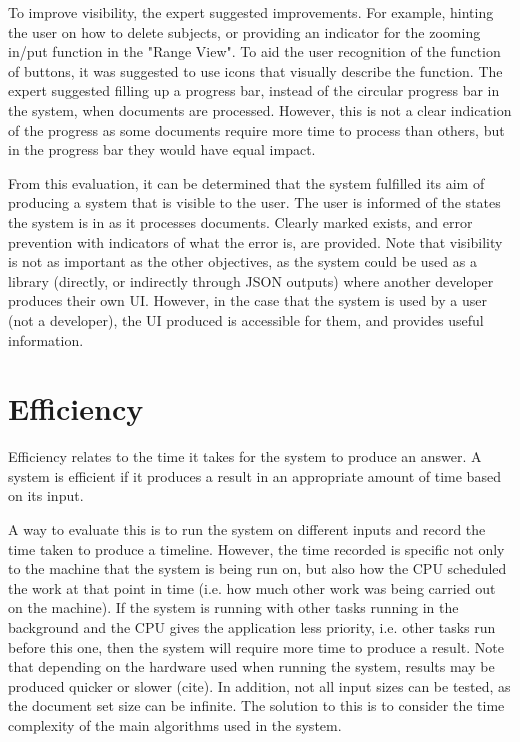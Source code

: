 \par To improve visibility, the expert suggested improvements. For example, hinting the user on how to delete subjects, or providing an indicator for the zooming in/put function in the "Range View". To aid the user recognition of the function of buttons, it was suggested to use icons that visually describe the function. The expert suggested filling up a progress bar, instead of the circular progress bar in the system, when documents are processed. However, this is not a clear indication of the progress as some documents require more time to process than others, but in the progress bar they would have equal impact.

\par From this evaluation, it can be determined that the system fulfilled its aim of producing a system that is visible to the user. The user is informed of the states the system is in as it processes documents. Clearly marked exists, and error prevention with indicators of what the error is, are provided. Note that visibility is not as important as the other objectives, as the system could be used as a library (directly, or indirectly through JSON outputs) where another developer produces their own UI. However, in the case that the system is used by a user (not a developer), the UI produced is accessible for them, and provides useful information.

\section{Efficiency}
\par Efficiency relates to the time it takes for the system to produce an answer. A system is efficient if it produces a result in an appropriate amount of time based on its input.

\par A way to evaluate this is to run the system on different inputs and record the time taken to produce a timeline. However, the time recorded is specific not only to the machine that the system is being run on, but also how the CPU scheduled the work at that point in time (i.e. how much other work was being carried out on the machine). If the system is running with other tasks running in the background and the CPU gives the application less priority, i.e. other tasks run before this one, then the system will require more time to produce a result. Note that depending on the hardware used when running the system, results may be produced quicker or slower (cite). In addition, not all input sizes can be tested, as the document set size can be infinite. The solution to this is to consider the time complexity of the main algorithms used in the system. 

